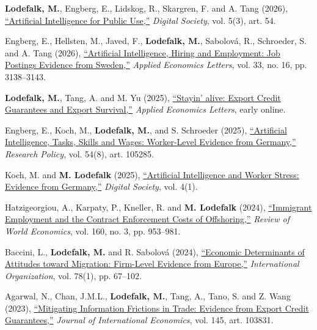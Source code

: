 \documentclass[11pt,a4paper]{article}
\newcommand{\name}[1]{\textbf{#1}}
\newcommand{\publication}[1]{\item #1}
\begin{document}
\begin{enumerate}[label={[\arabic*]}]

\publication{\name{Lodefalk, M.}, Engberg, E., Lidskog, R., Skargren, F. and A. Tang (2026), \href{https://doi.org/10.1007/s44206-026-00285-z}{``Artificial Intelligence for Public Use,''} \textit{Digital Society}, vol. 5(3), art. 54.} %

\publication{Engberg, E., Hellsten, M., Javed, F., \name{Lodefalk, M.}, Sabolová, R., Schroeder, S. and A. Tang (2026), \href{https://doi.org/10.1080/13504851.2025.2497431}{``Artificial Intelligence, Hiring and Employment: Job Postings Evidence from Sweden,''} \textit{Applied Economics Letters}, vol. 33, no. 16, pp. 3138--3143.} %

\publication{\name{Lodefalk, M.}, Tang, A. and M. Yu (2025), \href{https://doi.org/10.1080/13504851.2025.2549506}{``Stayin' alive: Export Credit Guarantees and Export Survival,''} \textit{Applied Economics Letters}, early online.}

\publication{Engberg, E., Koch, M., \name{Lodefalk, M.}, and S. Schroeder (2025), \href{https://doi.org/10.1016/j.respol.2025.105285}{``Artificial Intelligence, Tasks, Skills and Wages: Worker-Level Evidence from Germany,''} \textit{Research Policy}, vol. 54(8), art. 105285.}

\publication{Koch, M. and \name{M. Lodefalk} (2025), \href{https://doi.org/10.1007/s44206-025-00160-3}{``Artificial Intelligence and Worker Stress: Evidence from Germany,''} \textit{Digital Society}, vol. 4(1).}

\publication{Hatzigeorgiou, A., Karpaty, P., Kneller, R. and \name{M. Lodefalk} (2024), \href{https://doi.org/10.1007/s10290-023-00519-z}{``Immigrant Employment and the Contract Enforcement Costs of Offshoring,''} \textit{Review of World Economics}, vol. 160, no. 3, pp. 953--981.}

\publication{Baccini, L., \name{Lodefalk, M.} and R. Sabolová (2024), \href{https://doi.org/10.1017/s0020818323000255}{``Economic Determinants of Attitudes toward Migration: Firm-Level Evidence from Europe,''} \textit{International Organization}, vol. 78(1), pp. 67--102.}

\publication{Agarwal, N., Chan, J.M.L., \name{Lodefalk, M.}, Tang, A., Tano, S. and Z. Wang (2023), \href{https://doi.org/10.1016/j.jinteco.2023.103831}{``Mitigating Information Frictions in Trade: Evidence from Export Credit Guarantees,''} \textit{Journal of International Economics}, vol. 145, art. 103831.}


\end{enumerate}
\end{document}
